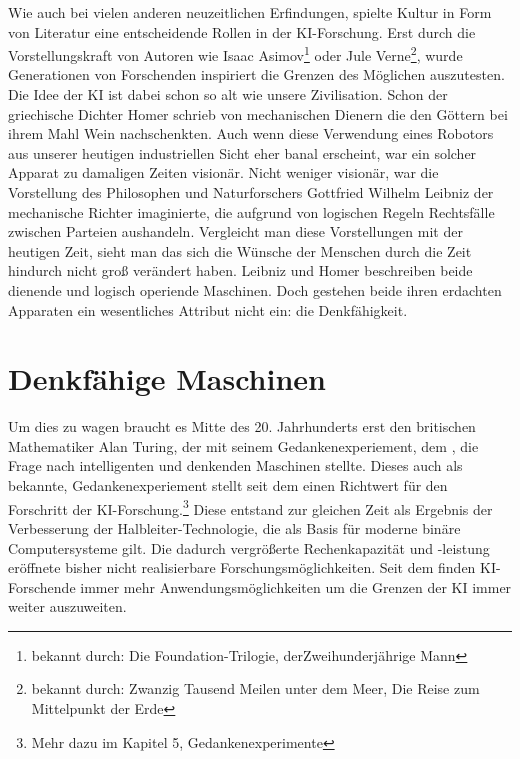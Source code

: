 \documentclass[12pt,german,ngerman]{report}
\begin{document}
Wie auch bei vielen anderen neuzeitlichen Erfindungen, spielte Kultur in Form von Literatur eine entscheidende Rollen
in der KI-Forschung. Erst durch die Vorstellungskraft von Autoren wie Isaac Asimov\footnote{bekannt durch: Die Foundation-Trilogie, derZweihunderjährige Mann}
oder Jule Verne\footnote{bekannt durch: Zwanzig Tausend Meilen unter dem Meer, Die Reise zum Mittelpunkt der Erde}, wurde Generationen
von Forschenden inspiriert die Grenzen des Möglichen auszutesten. Die Idee der KI ist dabei schon so alt wie unsere
Zivilisation. Schon der griechische Dichter Homer schrieb von mechanischen Dienern die den Göttern bei ihrem Mahl
Wein nachschenkten.\cite[53]{buchanan2005very} Auch wenn diese Verwendung eines Robotors aus unserer heutigen
industriellen Sicht eher banal erscheint, war ein solcher Apparat zu damaligen Zeiten visionär.
Nicht weniger visionär, war die Vorstellung des Philosophen und Naturforschers Gottfried Wilhelm Leibniz der mechanische
Richter imaginierte, die aufgrund von logischen Regeln Rechtsfälle zwischen Parteien aushandeln.\cite[53]{buchanan2005very}
Vergleicht man diese Vorstellungen mit der heutigen Zeit, sieht man das sich die Wünsche der Menschen durch die Zeit hindurch
nicht groß verändert haben. Leibniz und Homer beschreiben beide dienende und logisch operiende Maschinen.
Doch gestehen beide ihren erdachten Apparaten ein wesentliches Attribut nicht ein: die Denkfähigkeit. 
\section{Denkfähige Maschinen}
Um dies zu wagen braucht es Mitte des 20. Jahrhunderts erst den britischen Mathematiker Alan Turing, 
der mit seinem Gedankenexperiement, dem , die Frage nach intelligenten und denkenden Maschinen stellte.
Dieses auch als  bekannte, Gedankenexperiement stellt seit dem einen Richtwert für den Forschritt der KI-Forschung.\footnote{Mehr dazu im Kapitel 5, Gedankenexperimente}
Diese entstand zur gleichen Zeit als Ergebnis der Verbesserung der Halbleiter-Technologie, die als Basis für 
moderne binäre Computersysteme gilt. Die dadurch vergrößerte Rechenkapazität und -leistung eröffnete bisher nicht realisierbare Forschungsmöglichkeiten. 
Seit dem finden KI-Forschende immer mehr Anwendungsmöglichkeiten um die Grenzen der KI immer weiter auszuweiten.\\
\end{document}
